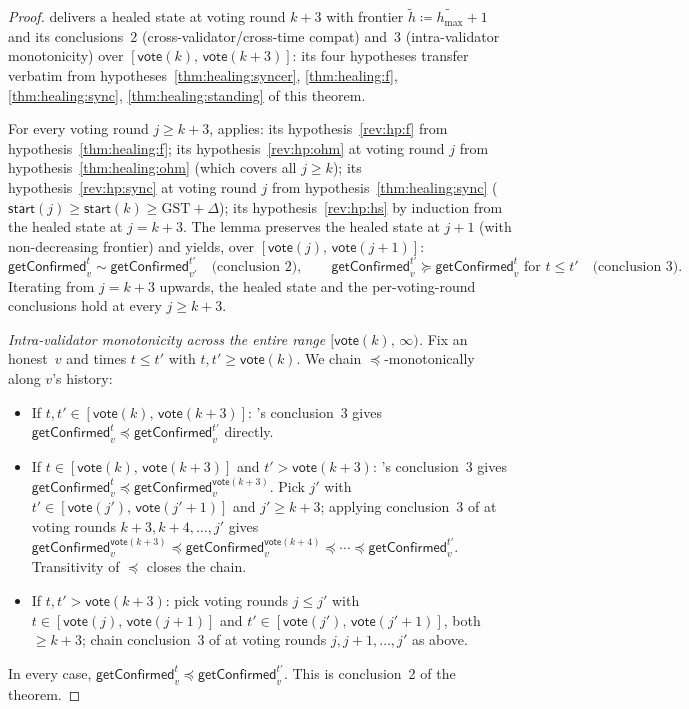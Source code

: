 \ifx\litemode\undefined\documentclass{article}\fi
\newcommand{\hmax}{\ensuremath{h_{\max}}\xspace}
\newcommand{\start}{\ensuremath{\mathsf{start}}}
\newcommand{\vote}{\ensuremath{\mathsf{vote}}}
\newcommand{\GST}{\ensuremath{\mathrm{GST}}\xspace}
\newcommand{\comm}[1]{\ensuremath{\widetilde{#1}}}
\newcommand{\getConfirmed}{\textsf{getConfirmed}\xspace}
\theoremstyle{plain}
\theoremstyle{definition}
\theoremstyle{remark}
\begin{document}
\begin{proof}
 delivers a healed state at voting round $k+3$ with frontier $\comm{h} \coloneqq \comm{\hmax}+1$ and its conclusions~2 (cross-validator/cross-time compat) and~3 (intra-validator monotonicity) over $[\vote(k),\, \vote(k+3)]$: its four hypotheses transfer verbatim from hypotheses~\ref{thm:healing:syncer}, \ref{thm:healing:f}, \ref{thm:healing:sync}, \ref{thm:healing:standing} of this theorem.

For every voting round $j \geq k+3$,  applies: its hypothesis~\ref{rev:hp:f} from hypothesis~\ref{thm:healing:f}; its hypothesis~\ref{rev:hp:ohm} at voting round $j$ from hypothesis~\ref{thm:healing:ohm} (which covers all $j \geq k$); its hypothesis~\ref{rev:hp:sync} at voting round $j$ from hypothesis~\ref{thm:healing:sync} ($\start(j) \geq \start(k) \geq \GST + \Delta$); its hypothesis~\ref{rev:hp:hs} by induction from the healed state at $j = k+3$.
The lemma preserves the healed state at $j+1$ (with non-decreasing frontier) and yields, over $[\vote(j),\, \vote(j{+}1)]$:
\[
  \getConfirmed_v^{t} \sim \getConfirmed_{v'}^{t'} \quad\text{(conclusion~2)}, \qquad
  \getConfirmed_v^{t'} \succeq \getConfirmed_v^{t} \text{ for } t \leq t' \quad\text{(conclusion~3)}.
\]
Iterating from $j = k+3$ upwards, the healed state and the per-voting-round conclusions hold at every $j \geq k+3$.

\medskip
\emph{Intra-validator monotonicity across the entire range $[\vote(k),\, \infty)$.}
Fix an honest~$v$ and times $t \leq t'$ with $t, t' \geq \vote(k)$. We chain $\preceq$-monotonically along $v$'s history:
\begin{itemize}
  \item If $t, t' \in [\vote(k),\, \vote(k+3)]$: 's conclusion~3 gives $\getConfirmed_v^{t} \preceq \getConfirmed_v^{t'}$ directly.
  \item If $t \in [\vote(k),\, \vote(k+3)]$ and $t' > \vote(k+3)$: 's conclusion~3 gives $\getConfirmed_v^{t} \preceq \getConfirmed_v^{\vote(k+3)}$. Pick $j'$ with $t' \in [\vote(j'),\, \vote(j'{+}1)]$ and $j' \geq k+3$; applying conclusion~3 of  at voting rounds $k+3, k+4, \ldots, j'$ gives $\getConfirmed_v^{\vote(k+3)} \preceq \getConfirmed_v^{\vote(k+4)} \preceq \cdots \preceq \getConfirmed_v^{t'}$. Transitivity of $\preceq$ closes the chain.
  \item If $t, t' > \vote(k+3)$: pick voting rounds $j \leq j'$ with $t \in [\vote(j),\, \vote(j{+}1)]$ and $t' \in [\vote(j'),\, \vote(j'{+}1)]$, both $\geq k+3$; chain conclusion~3 of  at voting rounds $j, j{+}1, \ldots, j'$ as above.
\end{itemize}
In every case, $\getConfirmed_v^{t} \preceq \getConfirmed_v^{t'}$. This is conclusion~2 of the theorem.


\end{proof}
\end{document}
